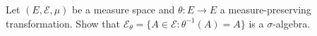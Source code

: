 \documentclass[11pt, headheight=30pt]{scrartcl}
\DeclareMathOperator{\var}{var}
\begin{document}











\section{}
\begin{prob}
    Let $(E, \mathcal{E}, \mu)$ be a measure space and
    $\theta : E \to E$ a measure-preserving transformation.
    Show that $\mathcal{E}_\theta = \{A \in \mathcal{E} : \theta^{-1}(A) = A\}$
    is a $\sigma$-algebra.
\end{prob}
\end{document}
